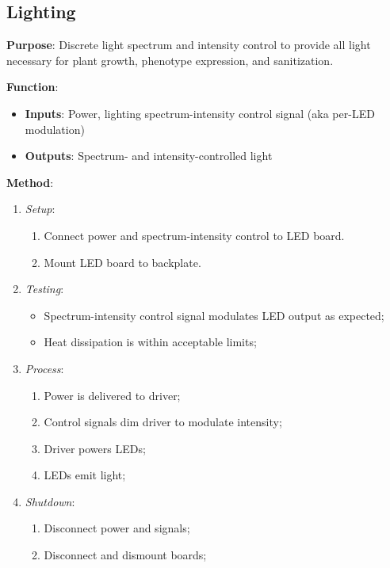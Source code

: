 \subsection{Lighting}
\label{sec:lighting}

\textbf{Purpose}: Discrete light spectrum and intensity control to provide all light necessary for plant growth, phenotype expression, and sanitization.

\textbf{Function}:
\begin{itemize}
    \item \textbf{Inputs}: Power, lighting spectrum-intensity control signal (aka per-LED modulation)
    \item \textbf{Outputs}: Spectrum- and intensity-controlled light
\end{itemize}

\textbf{Method}:
\begin{enumerate}
    \item \textit{Setup}:
    \begin{enumerate}
        \item Connect power and spectrum-intensity control to LED board.
        \item Mount LED board to backplate.
    \end{enumerate}
    \item \textit{Testing}:
    \begin{itemize}
        \item Spectrum-intensity control signal modulates LED output as expected;
        \item Heat dissipation is within acceptable limits;
    \end{itemize}
    \item \textit{Process}:
    \begin{enumerate}
        \item Power is delivered to driver;
        \item Control signals dim driver to modulate intensity;
        \item Driver powers LEDs;
        \item LEDs emit light;
    \end{enumerate}
    \item \textit{Shutdown}:
    \begin{enumerate}
        \item Disconnect power and signals;
        \item Disconnect and dismount boards;
    \end{enumerate}
\end{enumerate}

